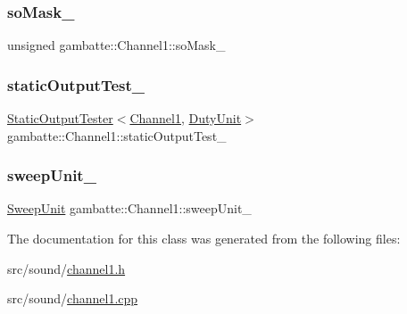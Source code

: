 \subsubsection{\texorpdfstring{so\+Mask\+\_\+}{soMask\_}}
{\footnotesize\ttfamily unsigned gambatte\+::\+Channel1\+::so\+Mask\+\_\+\hspace{0.3cm}{\ttfamily [private]}}

\mbox{\label{classgambatte_1_1Channel1_ad2a8bb48b34e55b0441785d90ef2de44}} 
\subsubsection{\texorpdfstring{static\+Output\+Test\+\_\+}{staticOutputTest\_}}
{\footnotesize\ttfamily \hyperlink{classgambatte_1_1StaticOutputTester}{Static\+Output\+Tester}$<$\hyperlink{classgambatte_1_1Channel1}{Channel1}, \hyperlink{classgambatte_1_1DutyUnit}{Duty\+Unit}$>$ gambatte\+::\+Channel1\+::static\+Output\+Test\+\_\+\hspace{0.3cm}{\ttfamily [private]}}

\mbox{\label{classgambatte_1_1Channel1_a897acd11661bcfed391947afd5fc3443}} 
\subsubsection{\texorpdfstring{sweep\+Unit\+\_\+}{sweepUnit\_}}
{\footnotesize\ttfamily \hyperlink{classgambatte_1_1Channel1_1_1SweepUnit}{Sweep\+Unit} gambatte\+::\+Channel1\+::sweep\+Unit\+\_\+\hspace{0.3cm}{\ttfamily [private]}}



The documentation for this class was generated from the following files\+:\begin{DoxyCompactItemize}
\item 
src/sound/\hyperlink{channel1_8h}{channel1.\+h}\item 
src/sound/\hyperlink{channel1_8cpp}{channel1.\+cpp}\end{DoxyCompactItemize}
